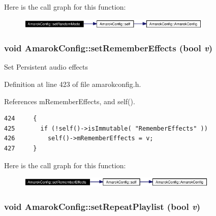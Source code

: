 Here is the call graph for this function:\begin{figure}[H]
\begin{center}
\leavevmode
\includegraphics[width=262pt]{classAmarokConfig_AmarokConfige19_cgraph}
\end{center}
\end{figure}
\subsubsection{\setlength{\rightskip}{0pt plus 5cm}void Amarok\-Config::set\-Remember\-Effects (bool {\em v})\hspace{0.3cm}{\tt  [inline, static]}}\label{classAmarokConfig_AmarokConfige43}


Set Persistent audio effects 

Definition at line 423 of file amarokconfig.h.

References m\-Remember\-Effects, and self().



\footnotesize\begin{verbatim}424     {
425       if (!self()->isImmutable( "RememberEffects" ))
426         self()->mRememberEffects = v;
427     }
\end{verbatim}\normalsize 


Here is the call graph for this function:\begin{figure}[H]
\begin{center}
\leavevmode
\includegraphics[width=271pt]{classAmarokConfig_AmarokConfige43_cgraph}
\end{center}
\end{figure}
\subsubsection{\setlength{\rightskip}{0pt plus 5cm}void Amarok\-Config::set\-Repeat\-Playlist (bool {\em v})\hspace{0.3cm}{\tt  [inline, static]}}\label{classAmarokConfig_AmarokConfige17}


